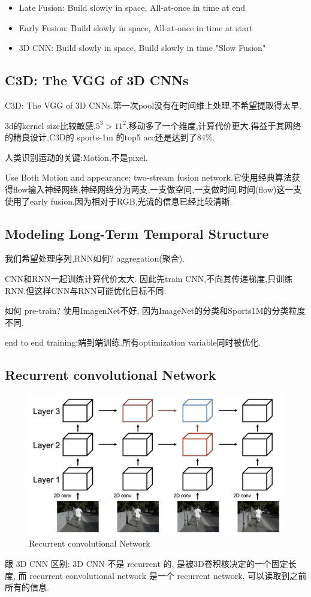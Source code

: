 \begin{itemize}
    \item Late Fusion: Build slowly in space, All-at-once in time at end
    \item Early Fusion: Build slowly in space, All-at-once in time at start
    \item 3D CNN: Build slowly in space, Build slowly in time "Slow Fusion"
\end{itemize}

\subsection{C3D: The VGG of 3D CNNs}

C3D: The VGG of 3D CNNs.第一次pool没有在时间维上处理,不希望提取得太早.

3d的kernel size比较敏感,$5^3 > 11^2$.移动多了一个维度,计算代价更大.得益于其网络的精良设计,C3D的 sports-1m 的top5 acc还是达到了84\%.

人类识别运动的关键:Motion,不是pixel.

Use Both Motion and appearance: two-stream fusion network.它使用经典算法获得flow输入神经网络.神经网络分为两支,一支做空间,一支做时间.时间(flow)这一支使用了early fusion,因为相对于RGB,光流的信息已经比较清晰.

\subsection{Modeling Long-Term Temporal Structure}

我们希望处理序列,RNN如何? aggregation(聚合).

CNN和RNN一起训练计算代价太大.
因此先train CNN,不向其传递梯度,只训练RNN.但这样CNN与RNN可能优化目标不同.

如何 pre-train? 使用ImagenNet不好, 因为ImageNet的分类和Sports1M的分类粒度不同.

end to end training:端到端训练.所有optimization variable同时被优化.

\subsection{Recurrent convolutional Network}

\begin{figure}[htbp]
    \centering
    \includegraphics[scale=0.25]{figures/recu_CNN.png}
    \caption{Recurrent convolutional Network}
\end{figure}

跟 3D CNN 区别: 3D CNN 不是 recurrent 的, 是被3D卷积核决定的一个固定长度, 
而 recurrent convolutional network 是一个 recurrent network, 可以读取到之前所有的信息.
